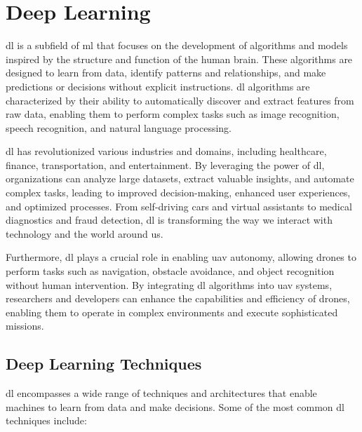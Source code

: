 \chapter{Deep Learning}
\label{ch:deep_learning}

\gls{dl} is a subfield of \gls{ml} that focuses on the development of algorithms and models inspired by the structure and function of the human brain. These algorithms are designed to learn from data, identify patterns and relationships, and make predictions or decisions without explicit instructions. \gls{dl} algorithms are characterized by their ability to automatically discover and extract features from raw data, enabling them to perform complex tasks such as image recognition, speech recognition, and natural language processing.

\gls{dl} has revolutionized various industries and domains, including healthcare, finance, transportation, and entertainment. By leveraging the power of \gls{dl}, organizations can analyze large datasets, extract valuable insights, and automate complex tasks, leading to improved decision-making, enhanced user experiences, and optimized processes. From self-driving cars and virtual assistants to medical diagnostics and fraud detection, \gls{dl} is transforming the way we interact with technology and the world around us.

Furthermore, \gls{dl} plays a crucial role in enabling \gls{uav} autonomy, allowing drones to perform tasks such as navigation, obstacle avoidance, and object recognition without human intervention. By integrating \gls{dl} algorithms into \gls{uav} systems, researchers and developers can enhance the capabilities and efficiency of drones, enabling them to operate in complex environments and execute sophisticated missions.

\section{Deep Learning Techniques}

\gls{dl} encompasses a wide range of techniques and architectures that enable machines to learn from data and make decisions. Some of the most common \gls{dl} techniques include:

